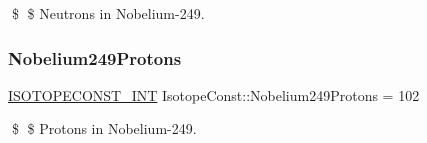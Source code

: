\$ \$ Neutrons in Nobelium-\/249. \mbox{\label{group___isotope_const-_nobelium-_no249_gae600bfaeb7d6270980352a3dbff9e8c9}} 
\subsubsection{\texorpdfstring{Nobelium249\+Protons}{Nobelium249Protons}}
{\footnotesize\ttfamily \mbox{\hyperlink{group___isotope_const-_macros_ga5f18360b3e99483a35c32d789e62621c}{I\+S\+O\+T\+O\+P\+E\+C\+O\+N\+S\+T\+\_\+\+I\+NT}} Isotope\+Const\+::\+Nobelium249\+Protons = 102}

\$ \$ Protons in Nobelium-\/249. 